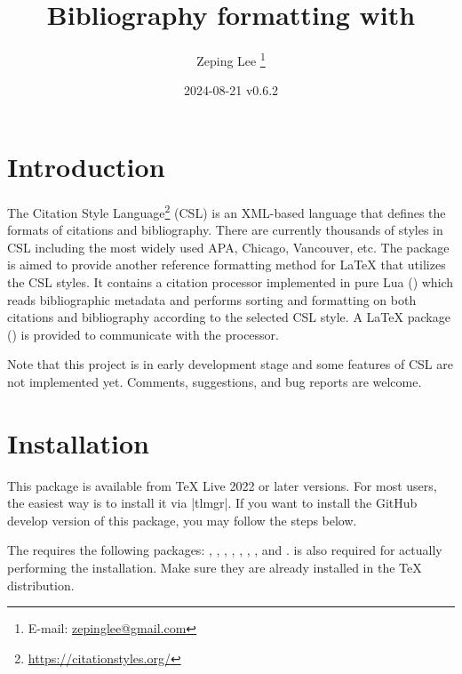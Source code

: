 \documentclass{l3doc}
\begin{document}
\title{%
  Bibliography formatting with 
}

\author{%
  Zeping Lee%
  \thanks{%
    E-mail:
    \href{mailto:zepinglee@gmail.com}
      {zepinglee@gmail.com}%
  }%
}

\date{2024-08-21 v0.6.2}

\maketitle


\begin{documentation}

\section{Introduction}

The Citation Style Language\footnote{\url{https://citationstyles.org/}} (CSL)
is an XML-based language that defines the formats of citations and bibliography.
There are currently thousands of styles in CSL including the most widely used
APA, Chicago, Vancouver, etc.
The  package is aimed to provide another reference formatting method
for LaTeX that utilizes the CSL styles.
It contains a citation processor implemented in pure Lua ()
which reads bibliographic metadata and performs sorting and formatting on both
citations and bibliography according to the selected CSL style.
A LaTeX package () is provided to communicate with the processor.

Note that this project is in early development stage and some features of CSL
are not implemented yet.
Comments, suggestions, and bug reports are welcome.


\section{Installation}

This package is available from TeX Live 2022 or later versions.
For most users, the easiest way is to install it via |tlmgr|.
If you want to install the GitHub develop version of this package,
you may follow the steps below.

The  requires the following packages:
, , , , ,
, , and .
 is also required for actually performing the installation.
Make sure they are already installed in the TeX distribution.


\end{documentation}
\end{document}
